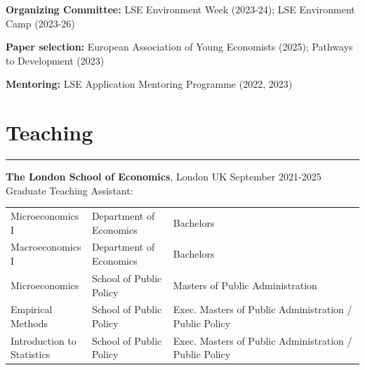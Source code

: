 \documentclass[10.5pt]{article}
\newcommand{\resumesection}[1]{\vspace{0.05cm}\section*{\large #1}\vspace{-0.2cm}\hrule\vspace{0.25cm}}
\begin{document}
\textbf{Organizing Committee:} LSE Environment Week (2023-24); LSE Environment Camp (2023-26)

\textbf{Paper selection:} European Association of Young Economists (2025); Pathways to Development (2023)

\textbf{Mentoring:} LSE Application Mentoring Programme (2022, 2023)

\resumesection{Teaching}
\textbf{The London School of Economics}, London UK \hfill September 2021-2025\vspace*{.2cm} \\
Graduate Teaching Assistant: \vspace*{.1cm}\\
\begin{tabular}{p{0.23\linewidth} p{0.23\linewidth} p{0.6\linewidth}}
Microeconomics I & Department of Economics & Bachelors \\
Macroeconomics I & Department of Economics & Bachelors \\
Microeconomics   & School of Public Policy & Masters of Public Administration \\
Empirical Methods & School of Public Policy & Exec. Masters of Public Administration / Public Policy \\
Introduction to Statistics & School of Public Policy & Exec. Masters of Public Administration / Public Policy \\
\end{tabular}
\end{document}
